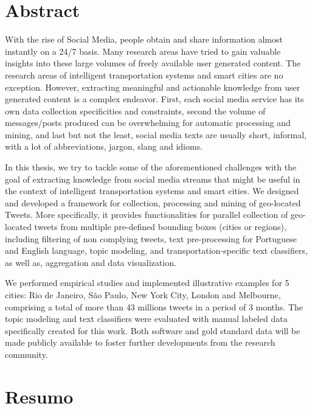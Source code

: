 \chapter*{Abstract}

With the rise of Social Media, people obtain and share information almost instantly on a 24/7 basis. Many research areas have tried to gain valuable insights into these large volumes of freely available user generated content. The research areas of intelligent transportation systems and smart cities are no exception. However, extracting meaningful and actionable knowledge from user generated content is a complex endeavor. First, each social media service has its own data collection specificities and constraints, second the volume of messages/posts produced can be overwhelming for automatic processing and mining, and last but not the least, social media texts are usually short, informal, with a lot of abbreviations, jargon, slang and idioms.
 
In this thesis, we try to tackle some of the aforementioned challenges with the goal of extracting knowledge from social media streams that might be useful in the context of intelligent transportation systems and smart cities. We designed and developed a framework for collection, processing and mining of geo-located Tweets. More specifically, it provides functionalities for parallel collection of geo-located tweets from multiple pre-defined bounding boxes (cities or regions), including filtering of non complying tweets, text pre-processing for Portuguese and English language, topic modeling, and transportation-specific text classifiers, as well as, aggregation and data visualization.
 
We performed empirical studies and implemented illustrative examples for 5 cities: Rio de Janeiro, São Paulo, New York City, London and Melbourne, comprising a total of more than 43 millions tweets in a period of 3 months. The topic modeling and text classifiers were evaluated with manual labeled data specifically created for this work. Both software and gold standard data will be made publicly available to foster further developments from the research community.


\chapter*{Resumo}

